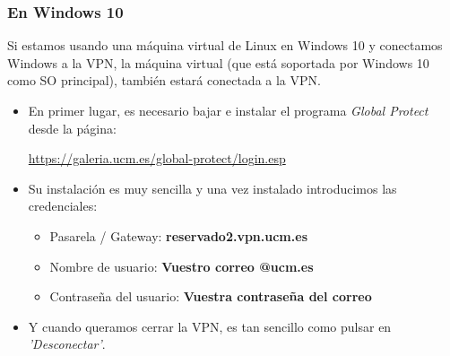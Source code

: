 \subsubsection{En Windows 10}
Si estamos usando una máquina virtual de Linux en Windows 10 y conectamos Windows a la VPN, la máquina virtual (que está soportada por Windows 10 como SO principal), también estará conectada a la VPN.
\begin{itemize}
    \item En primer lugar, es necesario bajar e instalar el programa \textit{Global Protect} desde la página:
    \begin{center}
        \url{https://galeria.ucm.es/global-protect/login.esp}
    \end{center}
    
    \item  Su instalación es muy sencilla y una vez instalado introducimos las credenciales:

 \begin{tcolorbox}
        \begin{center}
            \begin{itemize}
               \item Pasarela / Gateway: \textbf{reservado2.vpn.ucm.es} 
               \item Nombre de usuario: \textbf{Vuestro correo @ucm.es}
               \item Contraseña del usuario: \textbf{Vuestra contraseña del correo}
             \end{itemize}
        \end{center}
    \end{tcolorbox}
    
    \item Y cuando queramos cerrar la VPN, es tan sencillo como pulsar en \textit{'Desconectar'}.
\end{itemize}





